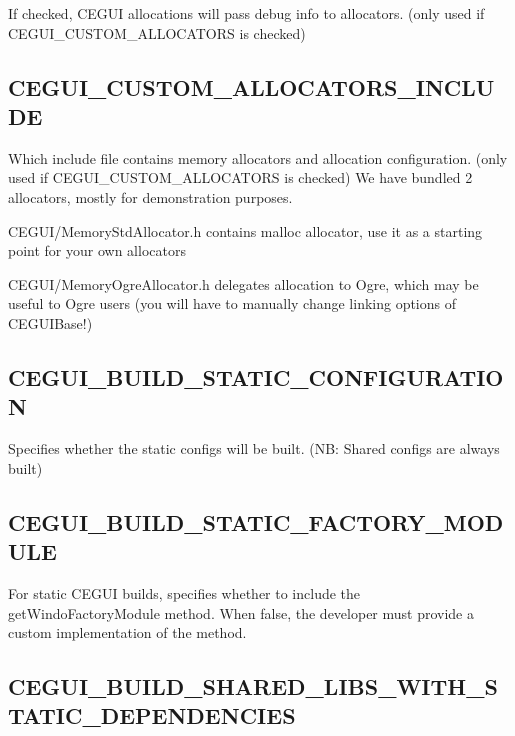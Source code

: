 If checked, C\+E\+G\+UI allocations will pass debug info to allocators. (only used if C\+E\+G\+U\+I\+\_\+\+C\+U\+S\+T\+O\+M\+\_\+\+A\+L\+L\+O\+C\+A\+T\+O\+RS is checked) \hypertarget{build_options_build_options_allocators_header}{}\subsection{C\+E\+G\+U\+I\+\_\+\+C\+U\+S\+T\+O\+M\+\_\+\+A\+L\+L\+O\+C\+A\+T\+O\+R\+S\+\_\+\+I\+N\+C\+L\+U\+DE}\label{build_options_build_options_allocators_header}
Which include file contains memory allocators and allocation configuration. (only used if C\+E\+G\+U\+I\+\_\+\+C\+U\+S\+T\+O\+M\+\_\+\+A\+L\+L\+O\+C\+A\+T\+O\+RS is checked) We have bundled 2 allocators, mostly for demonstration purposes.
\begin{DoxyItemize}
\item C\+E\+G\+U\+I/\+Memory\+Std\+Allocator.\+h contains malloc allocator, use it as a starting point for your own allocators
\item C\+E\+G\+U\+I/\+Memory\+Ogre\+Allocator.\+h delegates allocation to Ogre, which may be useful to Ogre users (you will have to manually change linking options of C\+E\+G\+U\+I\+Base!) 
\end{DoxyItemize}\hypertarget{build_options_build_options_enable_static}{}\subsection{C\+E\+G\+U\+I\+\_\+\+B\+U\+I\+L\+D\+\_\+\+S\+T\+A\+T\+I\+C\+\_\+\+C\+O\+N\+F\+I\+G\+U\+R\+A\+T\+I\+ON}\label{build_options_build_options_enable_static}
Specifies whether the static configs will be built. (NB\+: Shared configs are always built) \hypertarget{build_options_build_options_enable_static_factory}{}\subsection{C\+E\+G\+U\+I\+\_\+\+B\+U\+I\+L\+D\+\_\+\+S\+T\+A\+T\+I\+C\+\_\+\+F\+A\+C\+T\+O\+R\+Y\+\_\+\+M\+O\+D\+U\+LE}\label{build_options_build_options_enable_static_factory}
For static C\+E\+G\+UI builds, specifies whether to include the get\+Windo\+Factory\+Module method. When false, the developer must provide a custom implementation of the method. \hypertarget{build_options_build_options_static_deps}{}\subsection{C\+E\+G\+U\+I\+\_\+\+B\+U\+I\+L\+D\+\_\+\+S\+H\+A\+R\+E\+D\+\_\+\+L\+I\+B\+S\+\_\+\+W\+I\+T\+H\+\_\+\+S\+T\+A\+T\+I\+C\+\_\+\+D\+E\+P\+E\+N\+D\+E\+N\+C\+I\+ES}\label{build_options_build_options_static_deps}
